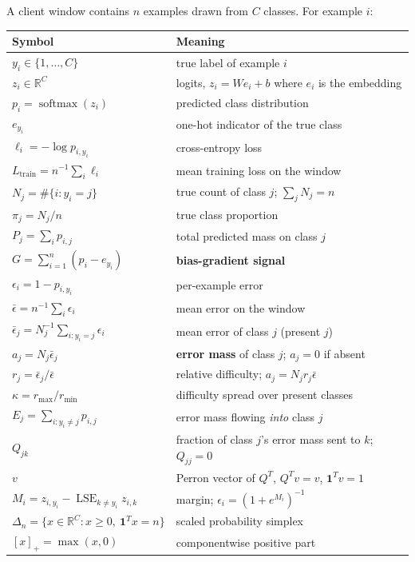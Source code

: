 \documentclass[11pt]{article}
\theoremstyle{remark}
\newcommand{\R}{\mathbb{R}}
\newcommand{\one}{\mathbf{1}}
\newcommand{\pos}[1]{\left[#1\right]_+}
\newcommand{\simplex}{\Delta_n}
\DeclareMathOperator{\softmax}{softmax}
\DeclareMathOperator{\LSE}{LSE}
\begin{document}
A client window contains $n$ examples drawn from $C$ classes. For
example $i$:

\begin{center}
\begin{tabular}{ll}
\toprule
Symbol & Meaning \\
\midrule
$y_i \in \{1,\dots,C\}$ & true label of example $i$ \\
$z_i \in \R^C$ & logits, $z_i = W e_i + b$ where $e_i$ is the embedding \\
$p_i = \softmax(z_i)$ & predicted class distribution \\
$e_{y_i}$ & one-hot indicator of the true class \\
$\ell_i = -\log p_{i,y_i}$ & cross-entropy loss \\
$L_{\mathrm{train}} = n^{-1}\sum_i \ell_i$ & mean training loss on the window \\
\midrule
$N_j = \#\{i : y_i = j\}$ & true count of class $j$; $\sum_j N_j = n$ \\
$\pi_j = N_j/n$ & true class proportion \\
$P_j = \sum_i p_{i,j}$ & total predicted mass on class $j$ \\
$G = \sum_{i=1}^n (p_i - e_{y_i})$ & \textbf{bias-gradient signal} \\
\midrule
$\epsilon_i = 1 - p_{i,y_i}$ & per-example error \\
$\bar\epsilon = n^{-1}\sum_i \epsilon_i$ & mean error on the window \\
$\bar\epsilon_j = N_j^{-1}\sum_{i:y_i=j}\epsilon_i$ & mean error of class $j$ (present $j$) \\
$a_j = N_j \bar\epsilon_j$ & \textbf{error mass} of class $j$; $a_j = 0$ if absent \\
$r_j = \bar\epsilon_j/\bar\epsilon$ & relative difficulty; $a_j = N_j r_j \bar\epsilon$ \\
$\kappa = r_{\max}/r_{\min}$ & difficulty spread over present classes \\
\midrule
$E_j = \sum_{i:y_i\ne j} p_{i,j}$ & error mass flowing \emph{into} class $j$ \\
$Q_{jk}$ & fraction of class $j$'s error mass sent to $k$; $Q_{jj}=0$ \\
$v$ & Perron vector of $Q^T$, $Q^Tv = v$, $\one^Tv=1$ \\
\midrule
$M_i = z_{i,y_i} - \LSE_{k\ne y_i} z_{i,k}$ & margin; $\epsilon_i = (1+e^{M_i})^{-1}$ \\
$\simplex = \{x \in \R^C : x \ge 0,\ \one^Tx = n\}$ & scaled probability simplex \\
$\pos{x} = \max(x,0)$ & componentwise positive part \\
\bottomrule
\end{tabular}
\end{center}
\end{document}
